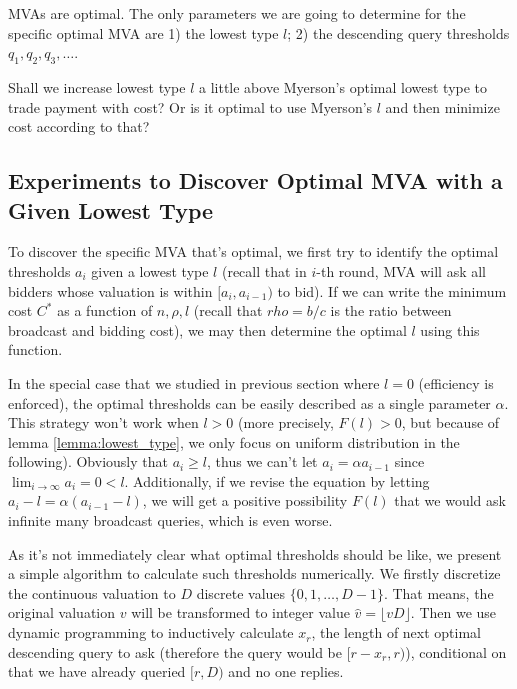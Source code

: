 \begin{corollary}

MVAs are optimal. The only parameters we are going to determine for the
specific optimal MVA are 1) the lowest type $l$; 2) the descending query
thresholds $q_1, q_2, q_3, \ldots$.

Shall we increase lowest type $l$ a little above Myerson's optimal lowest type
to trade payment with cost? Or is it optimal to use Myerson's $l$ and then
minimize cost according to that?

\end{corollary}

\subsection{Experiments to Discover Optimal MVA with a Given Lowest Type}

To discover the specific MVA that's optimal, we first try to identify the
optimal thresholds $a_i$ given a lowest type $l$  (recall that in $i$-th round,
MVA will ask all bidders whose valuation is within $[a_i, a_{i-1})$ to bid).
If we can write the minimum cost $C^*$ as a function of $n, \rho, l$ (recall
that $rho = b/c$ is the ratio between broadcast and bidding cost), we may then
determine the optimal $l$ using this function.

In the special case that we studied in previous section where $l = 0$
(efficiency is enforced), the optimal thresholds can be easily described as a
single parameter $\alpha$. This strategy won't work when $l > 0$ (more
precisely, $F(l) > 0$, but because of lemma \ref{lemma:lowest_type}, we only
focus on uniform distribution in the following). Obviously that $a_i \geq l$,
thus we can't let $a_i = \alpha a_{i-1}$ since $\lim_{i \rightarrow \infty} a_i
= 0 < l$.  Additionally, if we revise the equation by letting $a_i-l = \alpha
(a_{i-1}-l)$, we will get a positive possibility $F(l)$ that we would ask
infinite many broadcast queries, which is even worse.

As it's not immediately clear what optimal thresholds should be like, we
present a simple algorithm to calculate such thresholds numerically. We firstly
discretize the continuous valuation to $D$ discrete values $\{0, 1, \ldots,
D-1\}$. That means, the original valuation $v$ will be transformed to integer
value $\hat v = \lfloor v D \rfloor$. Then we use dynamic programming to
inductively calculate $x_r$, the length of next optimal descending query to ask
(therefore the query would be $[r-x_r, r)$), conditional on that we have
already queried $[r, D)$ and no one replies.

